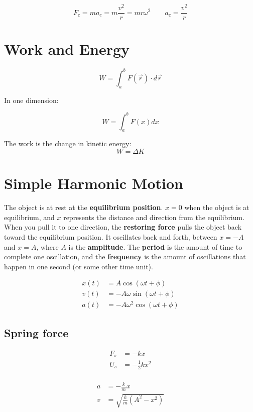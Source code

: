 \[
	F_c = ma_c = m \frac{v^2}{r} = mr\omega^2 \qquad a_c = \frac{v^2}{r}
\]

\section{Work and Energy}

\[
	W = \int_a^b F(\vec{r}) \cdot d\vec{r}
\]

In one dimension:

\[
	W = \int_a^b F(x) dx
\]

\begin{namedtheorem} The work is the change in kinetic energy: 
	\[
		W = \Delta K
	\]
\end{namedtheorem}

\section{Simple Harmonic Motion}

The object is at rest at the \textbf{equilibrium position}. $x = 0$ when the object is at equilibrium, and $x$ represents the distance and direction from the equilibrium. When you pull it to one direction, the \textbf{restoring force} pulls the object back toward the equilibrium position. It oscillates back and forth, between $x = -A$ and $x = A$, where $A$ is the \textbf{amplitude}. The \textbf{period} is the amount of time to complete one oscillation, and the \textbf{frequency} is the amount of oscillations that happen in one second (or some other time unit).

\begin{align*}
	x(t) &= A \cos(\omega t + \phi) \\
	v(t) &= -A\omega \sin(\omega t + \phi) \\
	a(t) &= -A \omega^2 \cos(\omega t + \phi)
\end{align*}

\subsection{Spring force}

\begin{align*}
	F_s &= -kx \\
	U_s &= -\tfrac{1}{2} kx^2 \\
\end{align*}

\begin{align*}
	a &= - \frac{k}{m} x \\
	v &= \sqrt{\frac{k}{m} (A^2 - x^2)} \\
\end{align*}

